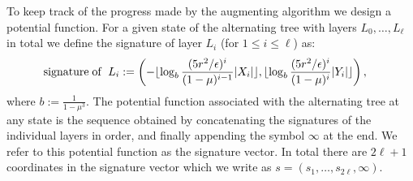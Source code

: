 \documentclass[11pt]{article}
\theoremstyle{definition}
\theoremstyle{remark}
\begin{document}
To keep track of the progress made by the augmenting algorithm we design a potential function. For a given state of the alternating tree with layers $L_0,\dots,L_\ell$ in total we define the signature of layer $L_i$ (for $1 \leq i \leq \ell$) as:
\begin{equation}\label{eqn:signature}
\begin{split}
\text{signature}& \text{\;of \;} L_i := \left(-\lfloor \log_b \frac{(5r^2/\epsilon)^i }{(1-\mu)^{i-1}} |X_i| \rfloor, \lfloor \log_b \frac{(5r^2/\epsilon)^i}{(1-\mu)^i} |Y_i| \rfloor    \right),
\end{split}
\end{equation}
where $b := \frac{1}{1-\mu^3}$. The potential function associated with
the alternating tree at any state is the sequence obtained by
concatenating the signatures of the individual layers in order, and
finally appending the symbol $\infty$ at the end. We refer to this
potential function as the signature vector. In total there are
$2\ell+1$ coordinates in the signature vector which we write as
$s = (s_1,\dots,s_{2\ell},\infty)$.
\end{document}
